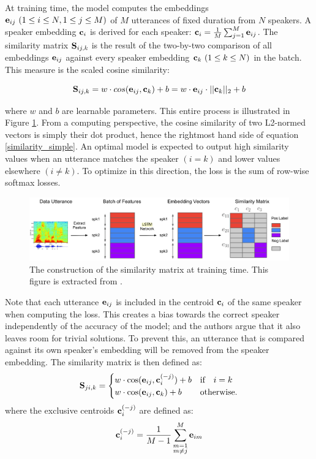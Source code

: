 \documentclass[a4paper, oneside, 12pt, english]{article}
\begin{document}
At training time, the model computes the embeddings $\mathbf{e}_{ij}\ (1 \leq i \leq N, 1 \leq j \leq M)$ of $M$ utterances of fixed duration from $N$ speakers. A speaker embedding $\mathbf{c}_i$ is derived for each speaker: $\mathbf{c}_i=\frac{1}{M}\sum_{j=1}^{M}\mathbf{e}_{ij}$. The similarity matrix $\mathbf{S}_{ij,k}$ is the result of the two-by-two comparison of all embeddings $\mathbf{e}_{ij}$ against every speaker embedding $\mathbf{c}_{k}\ (1 \leq k \leq N)$ in the batch. This measure is the scaled cosine similarity:

\begin{equation} \label{similarity_simple}
	\mathbf{S}_{ij,k} = w \cdot cos(\mathbf{e}_{ij}, \mathbf{c}_{k}) + b = w \cdot \mathbf{e}_{ij} \cdot ||\mathbf{c}_{k}||_2 + b
\end{equation}

where $w$ and $b$ are learnable parameters. This entire process is illustrated in Figure \ref{sim_matrix}.  From a computing perspective, the cosine similarity of two L2-normed vectors is simply their dot product, hence the rightmost hand side of equation \ref{similarity_simple}. An optimal model is expected to output high similarity values when an utterance matches the speaker $(i = k)$ and lower values elsewhere $(i \neq k)$. To optimize in this direction, the loss is the sum of row-wise softmax losses.

\begin{figure}[h]
	\centering
	\includegraphics[width=\linewidth]{images/sim_matrix.png}
	\caption{The construction of the similarity matrix at training time. This figure is extracted from \citep{GE2E}.}
	\label{sim_matrix}
\end{figure}

Note that each utterance $\mathbf{e}_{ij}$ is included in the centroid $\mathbf{c}_{i}$ of the same speaker when computing the loss. This creates a bias towards the correct speaker independently of the accuracy of the model; and the authors argue that it also leaves room for trivial solutions. To prevent this, an utterance that is compared against its own speaker's embedding will be removed from the speaker embedding. The similarity matrix is then defined as:
\begin{equation} \label{similarity_exclusive}
\mathbf{S}_{ji,k} =
\begin{cases}
w\cdot \cos(\mathbf{e}_{ij}, \mathbf{c}_i^{(-j)})+b & \text{if} \quad i=k \\
w\cdot \cos(\mathbf{e}_{ij}, \mathbf{c}_k)+b & \text{otherwise}.
\end{cases}
\end{equation}
where the exclusive centroids $\mathbf{c}_{i}^{(-j)}$ are defined as:
\begin{equation} \label{exclusive_centroid}
\mathbf{c}_{i}^{(-j)} = \frac{1}{M-1}\sum_{\substack{m=1\\m\neq j}}^{M}\mathbf{e}_{im}
\end{equation}
\end{document}
